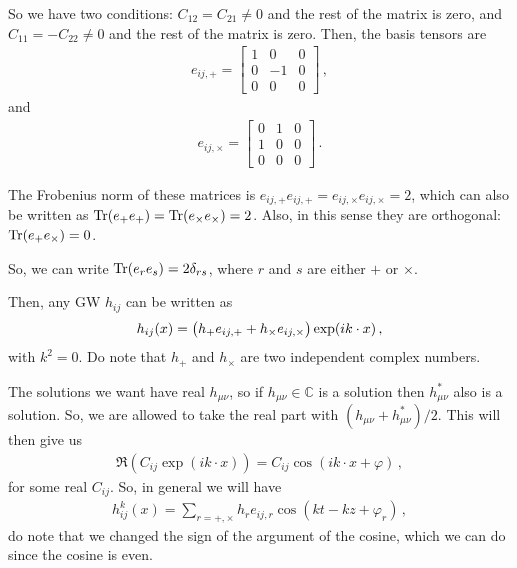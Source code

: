 \documentclass[main.tex]{subfiles}
\begin{document}
So we have two conditions: \(C_{12} = C_{21} \neq 0\) and the rest of the matrix is zero, and \(C_{11} = - C_{22} \neq 0\) and the rest of the matrix is zero. Then, the basis tensors are 
%
\begin{align}
e_{ij,+} = \left[\begin{array}{ccc}
1 & 0 & 0 \\ 
0 & -1 & 0 \\ 
0 & 0 & 0
\end{array}\right]  
\,,
\end{align}
%
and 
%
\begin{align}
e_{ij, \times } = \left[\begin{array}{ccc}
0 & 1 & 0 \\ 
1 & 0 & 0 \\ 
0 & 0 & 0
\end{array}\right] 
\,.
\end{align}
%

The Frobenius norm of these matrices is \(e_{ij,+} e_{ij, +} = e_{ij, \times} e_{ij, \times } = 2\), which can also be written as \(\operatorname{Tr} (e_{+} e_{+}) = \operatorname{Tr} (e_{ \times  } e_{ \times }) = 2\). Also, in this sense they are orthogonal: \(\operatorname{Tr} (e_{+} e_{ \times }) = 0\). 

So, we can write \(\operatorname{Tr} (e_{r} e_{s}) = 2 \delta_{rs}\), where  \(r\) and \(s\) are either \(+\) or \( \times \). 

Then, any GW \(h_{ij}\) can be written as 
%
\begin{align}
h_{ij} (x) = \qty(h_{+} e_{ij, +} + h_{ \times } e_{ij, \times }) \exp(i k \cdot x)
\,,
\end{align}
%
with \(k^2 = 0\). Do note that \(h_{+} \) and \(h_{ \times }\) are two independent complex numbers. 

The solutions we want have real \(h_{\mu \nu }\), so if \(h_{\mu \nu } \in \mathbb{C}\) is a solution then \(h_{\mu \nu }^{*}\) also is a solution. So, we are allowed to take the real part with \((h_{\mu \nu } + h_{\mu \nu }^{*}) / 2\). This will then give us 
%
\begin{align}
\Re (C_{ij} \exp(i k \cdot
 x ) ) = C_{ij}  \cos (i k \cdot x  + \varphi )
\,,
\end{align}
%
for some real \(C_{ij}\). So, in general we will have 
%
\begin{align}
h_{ij}^{k} (x) = \sum_{r = +, \times } h_{r} e_{ij, r} \cos(kt - kz + \varphi_{r} )
\,,
\end{align}
%
do note that we changed the sign of the argument of the cosine, which we can do since the cosine is even. 
\end{document}
